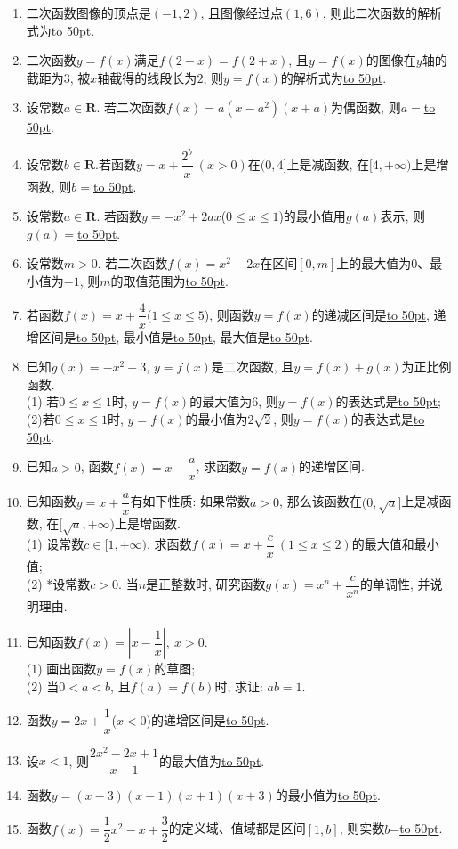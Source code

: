 \documentclass[10pt,a4paper]{article}
\newcommand{\blank}[1]{\underline{\hbox to #1pt{}}}
\begin{document}
\begin{enumerate}[1.]
\item 二次函数图像的顶点是$(-1,2)$, 且图像经过点$(1,6)$, 则此二次函数的解析式为\blank{50}.
\item 二次函数$y=f(x)$满足$f(2-x)=f(2+x)$, 且$y=f(x)$的图像在$y$轴的截距为$3$, 被$x$轴截得的线段长为$2$, 则$y=f(x)$的解析式为\blank{50}.
\item 设常数$a\in \mathbf{R}$. 若二次函数$f(x)=a(x-a^2)(x+a)$为偶函数, 则$a=$\blank{50}.
\item 设常数$b\in \mathbf{R}$.若函数$y=x+\dfrac{2^b}x \ (x>0)$在$(0,4]$上是减函数, 在$[4,+\infty)$上是增函数, 则$b=$\blank{50}.
\item 设常数$a\in \mathbf{R}$. 若函数$y=-x^2+2ax$($0\le x\le 1$)的最小值用$g(a)$表示, 则$g(a)=$\blank{50}.
\item 设常数$m>0$. 若二次函数$f(x)=x^2-2x$在区间$[0,m]$上的最大值为$0$、最小值为$-1$, 则$m$的取值范围为\blank{50}.
\item 若函数$f(x)=x+\dfrac 4x$($1\le x\le 5$), 则函数$y=f(x)$的递减区间是\blank{50}, 递增区间是\blank{50}, 最小值是\blank{50}, 最大值是\blank{50}.
\item 已知$g(x)=-x^2-3$, $y=f(x)$是二次函数, 且$y=f(x)+g(x)$为正比例函数.\\
(1) 若$0\le x\le 1$时, $y=f(x)$的最大值为6, 则$y=f(x)$的表达式是\blank{50};\\
(2)若$0\le x\le 1$时, $y=f(x)$的最小值为$2\sqrt 2$, 则$y=f(x)$的表达式是\blank{50}.
\item 已知$a>0$, 函数$f(x)=x-\dfrac ax$, 求函数$y=f(x)$的递增区间.
\item 已知函数$y=x+\dfrac ax$有如下性质: 如果常数$a>0$, 那么该函数在$(0, \sqrt a]$上是减函数, 在$[\sqrt a, +\infty)$上是增函数.\\
(1) 设常数$c\in [1,+\infty)$, 求函数$f(x)=x+\dfrac cx \ (1\le x\le 2)$的最大值和最小值;\\
(2) *设常数$c>0$. 当$n$是正整数时, 研究函数$g(x)=x^n+\dfrac c{x^n}$的单调性, 并说明理由.
\item 已知函数$f(x)=|x-\dfrac 1x|, \ x>0$.\\
(1)	画出函数$y=f(x)$的草图;\\
(2) 当$0<a<b$, 且$f(a)=f(b)$时, 求证: $ab=1$.
\item 函数$y=2x+\dfrac 1x$($x<0$)的递增区间是\blank{50}.
\item 设$x<1$, 则$\dfrac{2x^2-2x+1}{x-1}$的最大值为\blank{50}.
\item 函数$y=(x-3)(x-1)(x+1)(x+3)$的最小值为\blank{50}.
\item 函数$f(x)=\dfrac 12x^2-x+\dfrac 32$的定义域、值域都是区间$[1,b]$, 则实数$b$=\blank{50}.

\end{enumerate}
\end{document}
